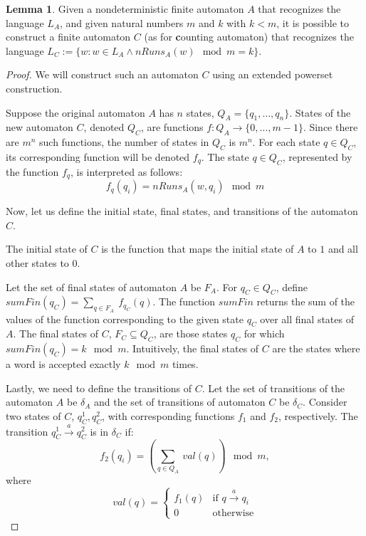 \documentclass[en]{pracamgr}
\theoremstyle{definition}
\newtheorem{lemma}[theorem]{Lemma}
\begin{document}
\begin{lemma}
    \label{CountRunsAutomaton}
    Given a nondeterministic finite automaton $A$ that recognizes the language $L_A$, and given natural numbers $m$ and $k$ with $k < m$, it is possible to construct a finite automaton $C$ (as for \textbf{c}ounting automaton) that recognizes the language $L_{C} := \{ w : w \in L_A \land nRuns_A(w) \mod m = k \}$.
\end{lemma}

\begin{proof}
    We will construct such an automaton $C$ using an extended powerset construction.

    Suppose the original automaton $A$ has $n$ states, $Q_A = \{q_1, \ldots, q_n\}$. States of the new automaton $C$, denoted $Q_C$, are functions $f: Q_A \rightarrow \{0, \ldots, m-1 \}$. Since there are $m^n$ such functions, the number of states in $Q_C$ is $m^n$. For each state $q \in Q_C$, its corresponding function will be denoted $f_q$. The state $q \in Q_C$, represented by the function $f_q$, is interpreted as follows:
    $$f_q(q_i) = nRuns_A(w, q_i) \mod m$$

    Now, let us define the initial state, final states, and transitions of the automaton $C$.

    The initial state of $C$ is the function that maps the initial state of $A$ to $1$ and all other states to $0$.

    Let the set of final states of automaton $A$ be $F_A$. For $q_C \in Q_C$, define $sumFin(q_C) = \sum_{q \in F_A} \ f_{q_C}(q)$. The function $sumFin$ returns the sum of the values of the function corresponding to the given state $q_C$ over all final states of $A$. The final states of $C$, $F_C \subseteq Q_C$, are those states $q_C$ for which $sumFin(q_C) = k \mod m$. Intuitively, the final states of $C$ are the states where a word is accepted exactly $k \mod m$ times.

    Lastly, we need to define the transitions of $C$. Let the set of transitions of the automaton $A$ be $\delta_A$ and the set of transitions of automaton $C$ be $\delta_C$. Consider two states of $C$, $q_C^1, q_C^2$, with corresponding functions $f_1$ and $f_2$, respectively. The transition $q_C^1 \xrightarrow{a} q_C^2$ is in $\delta_C$ if:
    $$f_2(q_i) = (\sum_{q \in Q_A} \ val(q)) \mod m,$$
    where
    \begin{equation*}
        val(q) =
            \begin{cases}
            f_1(q) & \text{if $q \xrightarrow{a} q_i$} \\
            0 & \text{otherwise}
            \end{cases}       
    \end{equation*}


\end{proof}
\end{document}
